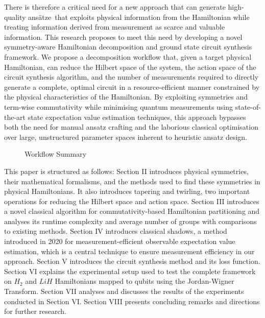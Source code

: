 \documentclass{article}
\newcommand{\ansatze}{ans\"atze~}
\begin{document}
There is therefore a critical need for a new approach that can generate high-quality \ansatze that exploits physical information from the Hamiltonian while treating information derived from measurement as scarce and valuable information. This research proposes to meet this need by developing a novel symmetry-aware Hamiltonian decomposition and ground state circuit synthesis framework.
We propose a decomposition workflow that, given a target physical Hamiltonian, can reduce the Hilbert space of the system, the action space of the circuit synthesis algorithm, and the number of measurements required to directly generate a complete, optimal circuit in a resource-efficient manner constrained by the physical characteristics of the Hamiltonian. By exploiting symmetries and term-wise commutativity while minimising quantum measurements using state-of-the-art state expectation value estimation techniques, this approach bypasses both the need for manual ansatz crafting and the laborious classical optimisation over large, unstructured parameter spaces inherent to heuristic ansatz design.

\begin{figure}[H]
    \centering
    \resizebox{\textwidth}{!}{%
    }
    \caption{Workflow Summary}
    \label{fig:summary}
\end{figure}

This paper is structured as follows: Section \RN{2} introduces physical symmetries, their mathematical formalisms, and the methods used to find these symmetries in physical Hamiltonians. It also introduces tapering and twirling, two important operations for reducing the Hilbert space and action space. Section \RN{3} introduces a novel classical algorithm for commutativity-based Hamiltonian partitioning and analyses its runtime complexity and average number of groups with comparisons to existing methods. Section \RN{4} introduces classical shadows, a method introduced in 2020 \cite{huangPredictingManyProperties2020} for measurement-efficient observable expectation value estimation, which is a central technique to ensure measurement efficiency in our approach. Section \RN{5} introduces the circuit synthesis method and its loss function. Section \RN{6} explains the experimental setup used to test the complete framework on $H_2$ and $LiH$ Hamiltonians mapped to qubits using the Jordan-Wigner Transform. Section \RN{7} analyses and discusses the results of the experiments conducted in Section \RN{6}.
Section \RN{8} presents concluding remarks and directions for further research.
	
\end{document}
